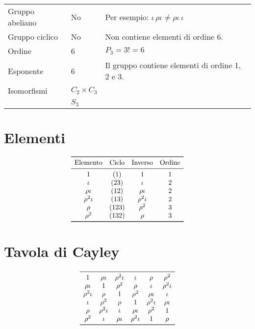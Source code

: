 \begin{center}
	\begin{tabular}{lll}
		Gruppo abeliano & No & Per esempio: $\iota\,\rho\iota \neq \rho\iota\,\iota$ \\
		Gruppo ciclico & No & Non contiene elementi di ordine 6. \\
		Ordine & 6 & $P_3 = 3! = 6$\\
		Esponente & 6 & Il gruppo contiene elementi di ordine 1, 2 e 3. \\
		Isomorfismi & $C_2 \times C_3$ &  \\
		& $S_3$ & 
	\end{tabular}
\end{center}

\section{Elementi}

\begin{center}
	\[
	\begin{array}{cccc}
		\toprule
		\text{Elemento} & \text{Ciclo} & \text{Inverso} & \text{Ordine} \\
		\midrule
		1 & (1)	& 1 & 1 \\
		\iota & (23) & \iota & 2 \\
		\rho\iota & (12) & \rho\iota & 2 \\
		\rho^2\iota & (13) & \rho^2\iota & 2 \\
		\rho & (123) & \rho^2 & 3 \\
		\rho^2 & (132) & \rho & 3 \\
		\bottomrule
	\end{array}
	\]
\end{center}

\section{Tavola di Cayley}

\begin{center}
	\[
	\begin{array}{cccccc}
		\midrule
		1 & \rho\iota & \rho^2\iota & \iota & \rho & \rho^2 \\
		\rho\iota & 1 & \rho^2 & \rho & \iota & \rho^2\iota \\
		\rho^2\iota & \rho & 1 & \rho^2 & \rho\iota & \iota \\
		\iota & \rho^2 & \rho & 1 & \rho^2\iota & \rho\iota \\
		\rho & \rho^2\iota & \iota & \rho\iota & \rho^2 & 1 \\
		\rho^2 & \iota & \rho\iota & \rho^2\iota & 1 & \rho \\
		\bottomrule
	\end{array}
	\]
\end{center}


